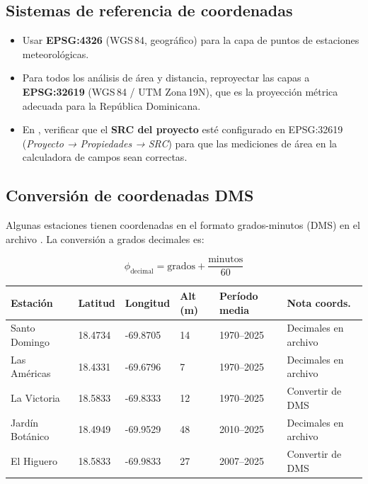 \documentclass[11pt]{article}
\begin{document}
\subsection*{Sistemas de referencia de coordenadas}

\begin{itemize}
  \item Usar \textbf{EPSG:4326} (WGS\,84, geográfico) para la capa de puntos de
    estaciones meteorológicas.
  \item Para todos los análisis de área y distancia, reproyectar las capas a
    \textbf{EPSG:32619} (WGS\,84 / UTM Zona\,19N), que es la proyección métrica
    adecuada para la República Dominicana.
  \item En \qgis{}, verificar que el \textbf{SRC del proyecto} esté configurado
    en EPSG:32619 (\emph{Proyecto → Propiedades → SRC}) para que las mediciones
    de área en la calculadora de campos sean correctas.
\end{itemize}

\subsection*{Conversión de coordenadas DMS}

Algunas estaciones tienen coordenadas en el formato grados-minutos (DMS)
en el archivo \indomet{}.  La conversión a grados decimales es:

\[
  \phi_{\text{decimal}} = \text{grados} + \frac{\text{minutos}}{60}
\]


\begin{table}[htb]
\centering
\small
{}
\begin{tabular}{llllll}
\toprule
\textbf{Estación} & \textbf{Latitud} & \textbf{Longitud} & \textbf{Alt (m)} & \textbf{Período media} & \textbf{Nota coords.} \\
\midrule
Santo Domingo   & 18.4734 & -69.8705 & 14 & 1970--2025 & Decimales en archivo \\
Las Américas    & 18.4331 & -69.6796 & 7  & 1970--2025 & Decimales en archivo \\
La Victoria     & 18.5833 & -69.8333 & 12 & 1970--2025 & Convertir de DMS \\
Jardín Botánico & 18.4949 & -69.9529 & 48 & 2010--2025 & Decimales en archivo \\
El Higuero      & 18.5833 & -69.9833 & 27 & 2007--2025 & Convertir de DMS \\
\bottomrule
\end{tabular}
\end{table}
\end{document}

